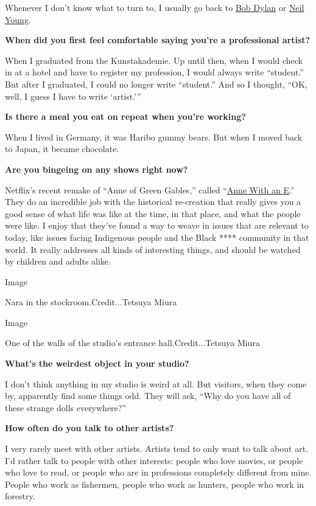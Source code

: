 Whenever I don't know what to turn to, I usually go back to
\href{https://www.nytimes3xbfgragh.onion/2020/06/12/arts/music/bob-dylan-rough-and-rowdy-ways.html}{Bob
Dylan} or
\href{https://www.nytimes3xbfgragh.onion/topic/person/neil-young}{Neil
Young}.

\textbf{When did you first feel comfortable saying you're a professional
artist?}

When I graduated from the Kunstakademie. Up until then, when I would
check in at a hotel and have to register my profession, I would always
write ``student.'' But after I graduated, I could no longer write
``student.'' And so I thought, ``OK, well, I guess I have to write
`artist.'''

\textbf{Is there a meal you eat on repeat when you're working?}

When I lived in Germany, it was Haribo gummy bears. But when I moved
back to Japan, it became chocolate.

\textbf{Are you bingeing on any shows right now?}

Netflix's recent remake of ``Anne of Green Gables,'' called
``\href{https://www.netflix.com/title/80136311}{Anne With an E}.'' They
do an incredible job with the historical re-creation that really gives
you a good sense of what life was like at the time, in that place, and
what the people were like. I enjoy that they've found a way to weave in
issues that are relevant to today, like issues facing Indigenous people
and the Black **** community in that world. It really addresses all
kinds of interesting things, and should be watched by children and
adults alike.

Image

Nara in the stockroom.Credit...Tetsuya Miura

Image

One of the walls of the studio's entrance hall.Credit...Tetsuya Miura

\textbf{What's the weirdest object in your studio?}

I don't think anything in my studio is weird at all. But visitors, when
they come by, apparently find some things odd. They will ask, ``Why do
you have all of these strange dolls everywhere?''

\textbf{How often do you talk to other artists?}

I very rarely meet with other artists. Artists tend to only want to talk
about art. I'd rather talk to people with other interests: people who
love movies, or people who love to read, or people who are in
professions completely different from mine. People who work as
fishermen, people who work as hunters, people who work in forestry.

